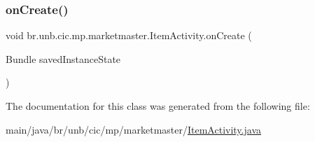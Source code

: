 \subsubsection{\texorpdfstring{on\+Create()}{onCreate()}}
{\footnotesize\ttfamily void br.\+unb.\+cic.\+mp.\+marketmaster.\+Item\+Activity.\+on\+Create (\begin{DoxyParamCaption}\item[{Bundle}]{saved\+Instance\+State }\end{DoxyParamCaption})\hspace{0.3cm}{\ttfamily [protected]}}



The documentation for this class was generated from the following file\+:\begin{DoxyCompactItemize}
\item 
main/java/br/unb/cic/mp/marketmaster/\mbox{\hyperlink{ItemActivity_8java}{Item\+Activity.\+java}}\end{DoxyCompactItemize}
